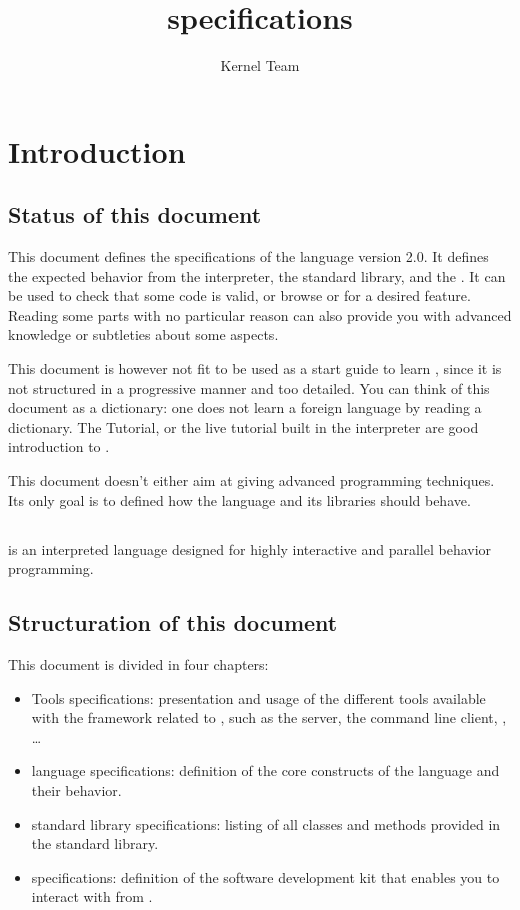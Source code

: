 \documentclass[openright,twoside,12pt]{report}
\title{\us 2.0 specifications}
\author{Kernel Team}
\begin{document}
\maketitle
\tableofcontents

\chapter{Introduction}

\section{Status of this document}

This document defines the specifications of the \us language version
2.0. It defines the expected behavior from the \us interpreter, the
standard library, and the \sdk. It can be used to check that some code
is valid, or browse \us or \Cxx \api for a desired feature. Reading
some parts with no particular reason can also provide you with
advanced knowledge or subtleties about some \us aspects.

This document is however not fit to be used as a start guide to learn
\us, since it is not structured in a progressive manner and too
detailed. You can think of this document as a dictionary: one does not
learn a foreign language by reading a dictionary. The \us Tutorial, or
the live \us tutorial built in the interpreter are good introduction
to \us.

This document doesn't either aim at giving advanced programming
techniques. Its only goal is to defined how the language and its
libraries should behave.

\section{\us}

\us is an interpreted language designed for highly interactive and
parallel behavior programming. %

\section{Structuration of this document}

This document is divided in four chapters:

\begin{itemize}
\item Tools specifications: presentation and usage of the different
  tools available with the \urbi framework related to \us, such as the
  \urbi server, the command line client, \umake, \ldots
\item \us language specifications: definition of the core constructs
  of the language and their behavior.
\item \us standard library specifications: listing of all classes and
  methods provided in the standard library.
\item \urbi \sdk specifications: definition of the \urbi software
  development kit that enables you to interact with \urbi from \Cxx.
\end{itemize}
\end{document}
